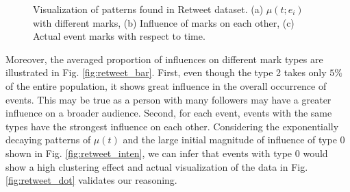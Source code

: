 \begin{figure}
    \centering
     \hspace{5mm}
    \caption{\small Visualization of patterns found in Retweet dataset. (a) $\mu(t;e_i)$ with different marks, (b) Influence of marks on each other, (c) Actual event marks with respect to time. 
    } 
    \label{fig:retweet pattern}
\end{figure} 

Moreover, the averaged proportion of influences on different mark types are illustrated in Fig. \ref{fig:retweet_bar}.
First, even though the type 2 takes only $5\%$ of the entire population, it shows great influence in the overall occurrence of events. %
This may be true as a person with many followers may have a greater influence on a broader audience. 
Second, for each event, events with the same types have the strongest influence on each other.
Considering the exponentially decaying patterns of $\mu(t)$ and the large initial magnitude of influence of type 0 shown in Fig. \ref{fig:retweet_inten}, we can infer that events with type 0 would show a high clustering effect 
and actual visualization of the data in Fig. \ref{fig:retweet_dot} validates our reasoning.


